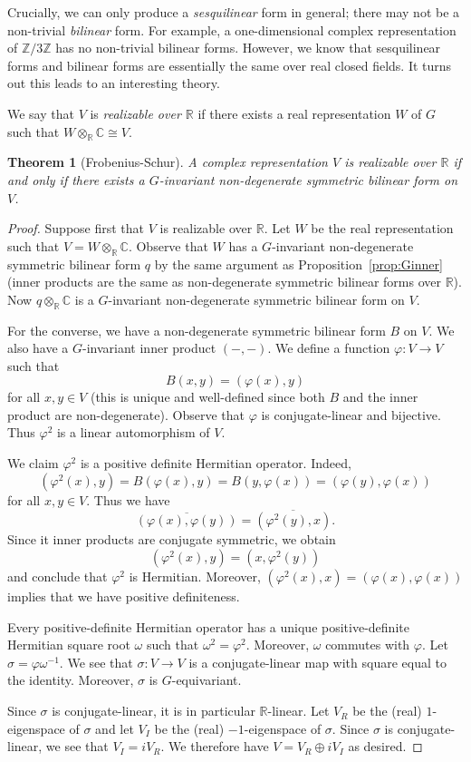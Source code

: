 \documentclass[12pt]{article}
\theoremstyle{plain}
\newtheorem{theorem}{Theorem}[section]
\theoremstyle{definition}
\theoremstyle{remark}
\numberwithin{equation}{section}
\begin{document}
Crucially, we can only produce a \emph{sesquilinear} form in general;
there may not be a non-trivial \emph{bilinear} form.
For example, a one-dimensional complex representation of
$\mathbb{Z}/3\mathbb{Z}$ has no non-trivial bilinear forms.
However, we know that sesquilinear forms and bilinear forms are
essentially the same over real closed fields.
It turns out this leads to an interesting theory. 

We say that $V$ is \emph{realizable over $\mathbb{R}$} if there exists a
real representation $W$ of $G$ such that $W \otimes_\mathbb{R}
\mathbb{C} \cong V$.

\begin{theorem}[Frobenius-Schur] \label{thm:FrobSchur}
A complex representation $V$ is realizable over $\mathbb{R}$ if and only
if there exists a $G$-invariant non-degenerate symmetric bilinear form
on $V$.
\end{theorem}

\begin{proof}
Suppose first that $V$ is realizable over $\mathbb{R}$.
Let $W$ be the real representation such that $V = W \otimes_\mathbb{R}
\mathbb{C}$.  Observe that $W$ has a $G$-invariant non-degenerate symmetric bilinear
form $q$ by the same argument as Proposition~\ref{prop:Ginner}
(inner products are the same as non-degenerate symmetric bilinear
forms over $\mathbb{R}$).  Now $q \otimes_\mathbb{R} \mathbb{C}$
is a $G$-invariant non-degenerate symmetric bilinear form on $V$.

For the converse, we have a non-degenerate symmetric bilinear form $B$
on $V$.  We also have a $G$-invariant inner product $(-,-)$.
We define a function $\varphi : V \to V$ such that
\[
B(x,y)=(\varphi(x),y)
\]
for all $x,y \in V$
(this is unique and well-defined since both $B$ and the inner product
are non-degenerate).
Observe that $\varphi$ is conjugate-linear and bijective.
Thus $\varphi^2$ is a linear automorphism of $V$.

We claim $\varphi^2$ is a positive definite Hermitian operator.
Indeed,
\[
(\varphi^2(x),y)=B(\varphi(x),y)=B(y,\varphi(x))=(\varphi(y),\varphi(x))
\]
for all $x,y \in V$.
Thus we have
\[
\overline{(\varphi(x),\varphi(y))}=\overline{(\varphi^2(y),x)}.
\]
Since it inner products are conjugate symmetric, we obtain
\[
(\varphi^2(x),y)=(x,\varphi^2(y))
\]
and conclude that $\varphi^2$ is Hermitian.
Moreover, $(\varphi^2(x),x)=(\varphi(x),\varphi(x))$
implies that we have positive definiteness.

Every positive-definite Hermitian operator has a unique
positive-definite Hermitian square root $\omega$ such that
$\omega^2=\varphi^2$.  Moreover, $\omega$ commutes with $\varphi$.
Let $\sigma = \varphi \omega^{-1}$.
We see that $\sigma : V \to V$ is a conjugate-linear map with square
equal to the identity.
Moreover, $\sigma$ is $G$-equivariant.

Since $\sigma$ is conjugate-linear, it is in particular
$\mathbb{R}$-linear. 
Let $V_R$ be the (real) $1$-eigenspace of $\sigma$ and let $V_I$ be the
(real) $-1$-eigenspace of $\sigma$.  Since $\sigma$ is conjugate-linear,
we see that $V_I=iV_R$.  We therefore have $V=V_R \oplus iV_I$
as desired.
\end{proof}
\end{document}
